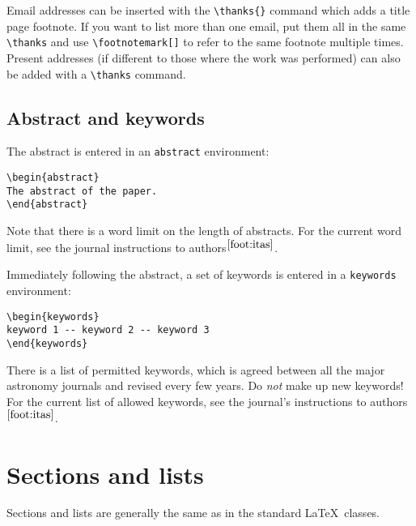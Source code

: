 \documentclass[fleqn,usenatbib,useAMS]{mnras}
\begin{document}
Email addresses can be inserted with the \verb'\thanks{}' command which adds a title page footnote.
If you want to list more than one email, put them all in the same \verb'\thanks' and use \verb'\footnotemark[]' to refer to the same footnote multiple times.
Present addresses (if different to those where the work was performed) can also be added with a \verb'\thanks' command.

\subsection{Abstract and keywords}

The abstract is entered in an \verb'abstract' environment:
\begin{verbatim}
\begin{abstract}
The abstract of the paper.
\end{abstract}
\end{verbatim}
\noindent Note that there is a word limit on the length of abstracts.
For the current word limit, see the journal instructions to authors$^{\ref{foot:itas}}$.

Immediately following the abstract, a set of keywords is entered in a \verb'keywords' environment:
\begin{verbatim}
\begin{keywords}
keyword 1 -- keyword 2 -- keyword 3
\end{keywords}
\end{verbatim}
\noindent There is a list of permitted keywords, which is agreed between all the major astronomy journals and revised every few years.
Do \emph{not} make up new keywords!
For the current list of allowed keywords, see the journal's instructions to authors$^{\ref{foot:itas}}$.

\section{Sections and lists}

Sections and lists are generally the same as in the standard \LaTeX\ classes.
\end{document}
